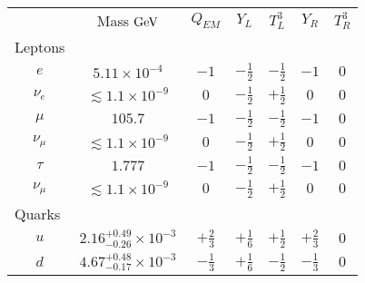 \begin{table}[tp]
\centering
\begin{tabular}{ccccccc}
                            & Mass$~\eV[G]$                       & $Q_{EM}$             & $Y_L$                & $T^3_L$              & $Y_R$                & $T^3_R$              \\
\multicolumn{1}{l}{Leptons} & \multicolumn{1}{l}{}                & \multicolumn{1}{l}{} & \multicolumn{1}{l}{} & \multicolumn{1}{l}{} & \multicolumn{1}{l}{} & \multicolumn{1}{l}{} \\
$e$                         & $5.11\times10^{-4}$                 & $-1$                 & $-\frac{1}{2}$       & $-\frac{1}{2}$       & $-1$                 & $0$                  \\
$\nu_e$                     & $\lesssim 1.1\times10^{-9}$         & $0$                  & $-\frac{1}{2}$       & $+\frac{1}{2}$       & $0$                  & $0$                  \\
$\mu$                       & $105.7$                             & $-1$                 & $-\frac{1}{2}$       & $-\frac{1}{2}$       & $-1$                 & $0$                  \\
$\nu_\mu$                   & $\lesssim 1.1\times10^{-9}$         & $0$                  & $-\frac{1}{2}$       & $+\frac{1}{2}$       & $0$                  & $0$                  \\
$\tau$                      & $1.777$                             & $-1$                 & $-\frac{1}{2}$       & $-\frac{1}{2}$       & $-1$                 & $0$                  \\
$\nu_\mu$                   & $\lesssim 1.1\times10^{-9}$         & $0$                  & $-\frac{1}{2}$       & $+\frac{1}{2}$       & $0$                  & $0$                  \\
\multicolumn{1}{l}{Quarks}  & \multicolumn{1}{l}{}                & \multicolumn{1}{l}{} & \multicolumn{1}{l}{} & \multicolumn{1}{l}{} & \multicolumn{1}{l}{} & \multicolumn{1}{l}{} \\
$u$                         & $2.16^{+0.49}_{-0.26}\times10^{-3}$ & $+\frac{2}{3}$       & $+\frac{1}{6}$       & $+\frac{1}{2}$       & $+\frac{2}{3}$       & $0$                  \\
$d$                         & $4.67^{+0.48}_{-0.17}\times10^{-3}$ & $-\frac{1}{3}$       & $+\frac{1}{6}$       & $-\frac{1}{2}$       & $-\frac{1}{3}$       & $0$                  \\

\end{tabular}
\end{table}
